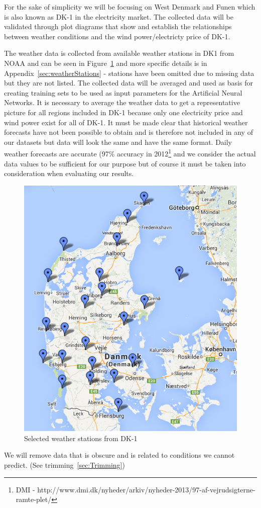 For the sake of simplicity we will be focusing on West Denmark and Funen which is also known as DK-1 in the electricity market. The collected data will be validated through plot diagrams that show and establish the relationships between weather conditions and the wind power/electricty price of DK-1.

The weather data is collected from available weather stations in DK1 from NOAA and can be seen in Figure~\ref{fig:stations4average} and more specific details is in Appendix~\ref{sec:weatherStations} - stations have been omitted due to missing data but they are not listed. The collected data will be averaged and used as basis for creating training sets to be used as input parameters for the Artificial Neural Networks. It is necessary to average the weather data to get a representative picture for all regions included in DK-1 because only one electricity price and wind power exist for all of DK-1. It must be made clear that historical weather forecasts have not been possible to obtain and is therefore not included in any of our datasets but data will look the same and have the same format. Daily weather forecasts are accurate (97\% accuracy in 2012\footnote{DMI - http://www.dmi.dk/nyheder/arkiv/nyheder-2013/97-af-vejrudsigterne-ramte-plet/} and we consider the actual data values to be sufficient for our purpose but of course it must be taken into consideration when evaluating our results.

\begin{figure}[H]
\centering
\includegraphics[width=0.85\linewidth]{billeder/stations4average.png}
\caption{Selected weather stations from DK-1}
\label{fig:stations4average}
\end{figure}


We will remove data that is obscure and is related to conditions we cannot predict. (See trimming~\ref{sec:Trimming})